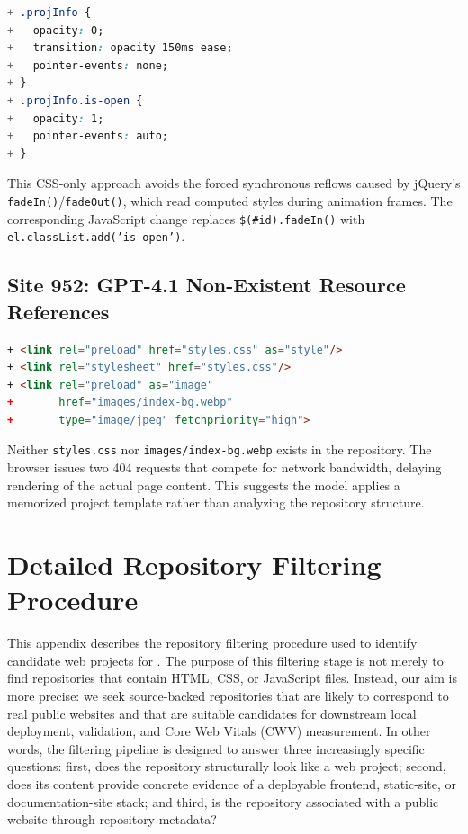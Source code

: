 \begin{lstlisting}[caption={GPT-5 patch for site 404 (excerpt). Replaces jQuery \texttt{fadeIn}/\texttt{fadeOut} with CSS transitions, eliminating synchronous layout thrashing.},label={lst:gpt5-404},language=CSS,basicstyle=\ttfamily\footnotesize,breaklines=true]
+ .projInfo {
+   opacity: 0;
+   transition: opacity 150ms ease;
+   pointer-events: none;
+ }
+ .projInfo.is-open {
+   opacity: 1;
+   pointer-events: auto;
+ }
\end{lstlisting}

This CSS-only approach avoids the forced synchronous reflows caused by jQuery's \texttt{fadeIn()}/\texttt{fadeOut()}, which read computed styles during animation frames. The corresponding JavaScript change replaces \texttt{\$(\#id).fadeIn()} with \texttt{el.classList.add('is-open')}.

\subsection{Site 952: GPT-4.1 Non-Existent Resource References}
\label{app:patch-952-gpt41}

\begin{lstlisting}[caption={GPT-4.1 patch for site 952 (excerpt). References files that do not exist in the repository, causing 404 errors during page load.},label={lst:gpt41-952},language=html,basicstyle=\ttfamily\footnotesize,breaklines=true]
+ <link rel="preload" href="styles.css" as="style"/>
+ <link rel="stylesheet" href="styles.css"/>
+ <link rel="preload" as="image"
+       href="images/index-bg.webp"
+       type="image/jpeg" fetchpriority="high">
\end{lstlisting}

Neither \texttt{styles.css} nor \texttt{images/index-bg.webp} exists in the repository. The browser issues two 404 requests that compete for network bandwidth, delaying rendering of the actual page content. This suggests the model applies a memorized project template rather than analyzing the repository structure.

\section{Detailed Repository Filtering Procedure}
\label{app:repo-filtering}

This appendix describes the repository filtering procedure used to identify candidate web projects for \OurBench. The purpose of this filtering stage is not merely to find repositories that contain HTML, CSS, or JavaScript files. Instead, our aim is more precise: we seek source-backed repositories that are likely to correspond to real public websites and that are suitable candidates for downstream local deployment, validation, and Core Web Vitals (CWV) measurement. In other words, the filtering pipeline is designed to answer three increasingly specific questions: first, does the repository structurally look like a web project; second, does its content provide concrete evidence of a deployable frontend, static-site, or documentation-site stack; and third, is the repository associated with a public website through repository metadata?

